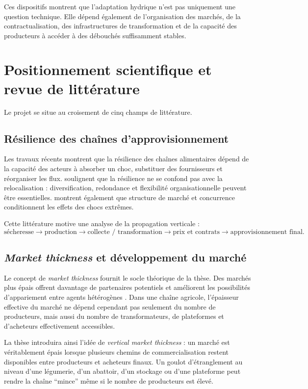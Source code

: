\documentclass[11pt,a4paper]{article}
\begin{document}
Ces dispositifs montrent que l'adaptation hydrique n'est pas uniquement une question technique. Elle dépend également de l'organisation des marchés, de la contractualisation, des infrastructures de transformation et de la capacité des producteurs à accéder à des débouchés suffisamment stables.

\section{Positionnement scientifique et revue de littérature}

Le projet se situe au croisement de cinq champs de littérature.

\subsection*{Résilience des chaînes d'approvisionnement}

Les travaux récents montrent que la résilience des chaînes alimentaires dépend de la capacité des acteurs à absorber un choc, substituer des fournisseurs et réorganiser les flux. \citet{HobbsHadachek2024} soulignent que la résilience ne se confond pas avec la relocalisation : diversification, redondance et flexibilité organisationnelle peuvent être essentielles. \citet{MaHadachekSexton2024} montrent également que structure de marché et concurrence conditionnent les effets des chocs extrêmes.

Cette littérature motive une analyse de la propagation verticale :
\[
\text{sécheresse}
\rightarrow
\text{production}
\rightarrow
\text{collecte / transformation}
\rightarrow
\text{prix et contrats}
\rightarrow
\text{approvisionnement final}.
\]

\subsection*{\textit{Market thickness} et développement du marché}

Le concept de \textit{market thickness} fournit le socle théorique de la thèse. Des marchés plus épais offrent davantage de partenaires potentiels et améliorent les possibilités d'appariement entre agents hétérogènes \citep{LoertscherMuir2025}. Dans une chaîne agricole, l'épaisseur effective du marché ne dépend cependant pas seulement du nombre de producteurs, mais aussi du nombre de transformateurs, de plateformes et d'acheteurs effectivement accessibles.

La thèse introduira ainsi l'idée de \textit{vertical market thickness} : un marché est véritablement épais lorsque plusieurs chemins de commercialisation restent disponibles entre producteurs et acheteurs finaux. Un goulot d'étranglement au niveau d'une légumerie, d'un abattoir, d'un stockage ou d'une plateforme peut rendre la chaîne ``mince'' même si le nombre de producteurs est élevé.
\end{document}

